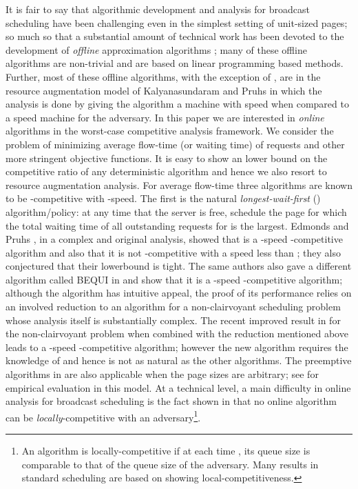 \documentclass[11pt]{article}
\begin{document}
\begin{titlepage}
It is fair to say that algorithmic development and analysis for
broadcast scheduling have been challenging even in the simplest
setting of unit-sized pages; so much so that a substantial amount of
technical work has been devoted to the development of {\em offline}
approximation algorithms
\cite{KalyanasundaramPV00,ErlebachH02,GandhiKKW04,GandhiKPS06,BansalCKN05,BansalCS06};
many of these offline algorithms are non-trivial and are based on
linear programming based methods. Further, most of these offline
algorithms, with the exception of \cite{BansalCS06}, are in the
resource augmentation model of Kalyanasundaram and Pruhs
\cite{KalyanasundaramP95} in which the analysis is done by giving the
algorithm a machine with speed  when compared to a speed 
machine for the adversary.  In this paper we are interested in {\em
  online} algorithms in the worst-case competitive analysis
framework. We consider the problem of minimizing average flow-time (or
waiting time) of requests and other more stringent objective
functions. It is easy to show an  lower bound on the
competitive ratio \cite{KalyanasundaramPV00} of any deterministic
algorithm and hence we also resort to resource augmentation analysis.
For average flow-time three algorithms are known to be
-competitive with -speed.  The first is the natural {\em
  longest-wait-first} () algorithm/policy: at any time  that
the server is free, schedule the page  for which the total waiting
time of all outstanding requests for  is the largest. Edmonds and
Pruhs \cite{EdmondsP04}, in a complex and original analysis, showed
that  is a -speed -competitive algorithm and also that
it is not -competitive with a speed less than
; they also conjectured that their lowerbound is tight. The same authors also gave a different algorithm
called BEQUI in \cite{EdmondsP03} and show that it is a
-speed -competitive algorithm; although the algorithm
has intuitive appeal, the proof of its
performance relies on an involved reduction to an algorithm for a
non-clairvoyant scheduling problem \cite{Edmonds00} whose analysis
itself is substantially complex. The recent improved result in
\cite{EdmondsP09} for the non-clairvoyant problem when combined with
the reduction mentioned above leads to a -speed
-competitive algorithm; however the new algorithm requires the
knowledge of  and hence is not as natural as the other
algorithms. The preemptive algorithms in \cite{EdmondsP03,EdmondsP09} are also
applicable when the page sizes are arbitrary; see
\cite{Hall03} for empirical evaluation in this model.
At a technical level, a main difficulty in online analysis for broadcast
scheduling is the fact shown in \cite{KalyanasundaramPV00} that no
online algorithm can be {\em locally}-competitive with an adversary\footnote{An algorithm is locally-competitive if at each time , its queue size
is comparable to that of the queue size of the adversary. Many results in
standard scheduling are based on showing local-competitiveness.}.


\end{titlepage}
\end{document}
